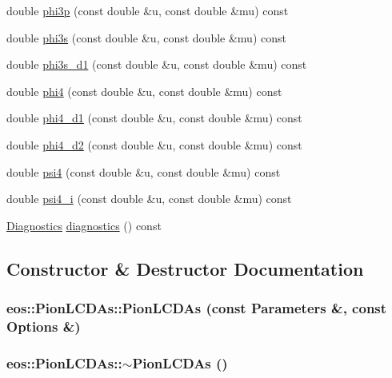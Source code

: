 \begin{DoxyCompactItemize}
\item 
double \hyperlink{classeos_1_1PionLCDAs_ac0f6b8d17ffe7b7e6f4ffcfa46e1d353}{phi3p} (const double \&u, const double \&mu) const 
\item 
double \hyperlink{classeos_1_1PionLCDAs_a41fcd9e04a0f84c01b2168c7fba13164}{phi3s} (const double \&u, const double \&mu) const 
\item 
double \hyperlink{classeos_1_1PionLCDAs_a821f18698397f85d42746ffeb7086ffa}{phi3s\_\-d1} (const double \&u, const double \&mu) const 
\item 
double \hyperlink{classeos_1_1PionLCDAs_a0a4f734894305e27fbcab789f9d61510}{phi4} (const double \&u, const double \&mu) const 
\item 
double \hyperlink{classeos_1_1PionLCDAs_acb4c831f65e2758d01263b7b4a121e7c}{phi4\_\-d1} (const double \&u, const double \&mu) const 
\item 
double \hyperlink{classeos_1_1PionLCDAs_ae2915f62dae4fe58776ff3367dff2ace}{phi4\_\-d2} (const double \&u, const double \&mu) const 
\item 
double \hyperlink{classeos_1_1PionLCDAs_ada2c4aa48e04c0f9de3511fd04333982}{psi4} (const double \&u, const double \&mu) const 
\item 
double \hyperlink{classeos_1_1PionLCDAs_aabea6be529b7aacdcccb10f3a8861a81}{psi4\_\-i} (const double \&u, const double \&mu) const 
\item 
\hyperlink{classeos_1_1Diagnostics}{Diagnostics} \hyperlink{classeos_1_1PionLCDAs_ae8727041baafa8c3007ef45a30f6d6ed}{diagnostics} () const 
\end{DoxyCompactItemize}


\subsection{Constructor \& Destructor Documentation}
\hypertarget{classeos_1_1PionLCDAs_af4511a0652b92c1b152580de069d4ac5}{
\subsubsection[{PionLCDAs}]{\setlength{\rightskip}{0pt plus 5cm}eos::PionLCDAs::PionLCDAs (const {\bf Parameters} \&, \/  const {\bf Options} \&)}}
\label{classeos_1_1PionLCDAs_af4511a0652b92c1b152580de069d4ac5}
\hypertarget{classeos_1_1PionLCDAs_a6292a3aaf8e686e3fc319a1b7901f817}{
\subsubsection[{$\sim$PionLCDAs}]{\setlength{\rightskip}{0pt plus 5cm}eos::PionLCDAs::$\sim$PionLCDAs ()}}
\label{classeos_1_1PionLCDAs_a6292a3aaf8e686e3fc319a1b7901f817}


